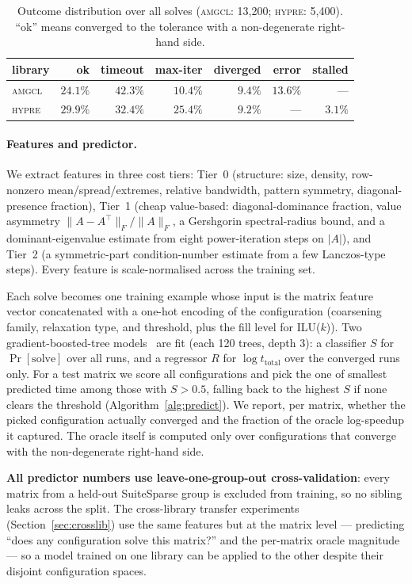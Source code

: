 \documentclass[11pt]{article}
\newcommand{\amgcl}{\textsc{amgcl}}
\newcommand{\hypre}{\textsc{hypre}}
\begin{document}
\begin{table}[t]
\centering
\caption{Outcome distribution over all solves (\amgcl{}: 13{,}200; \hypre{}:
5{,}400). ``ok'' means converged to the tolerance with a non-degenerate
right-hand side.}
\label{tab:status}
\small
\begin{tabular}{@{}lrrrrrr@{}}
\toprule
library & ok & timeout & max-iter & diverged & error & stalled \\
\midrule
\amgcl{} & $24.1\%$ & $42.3\%$ & $10.4\%$ & $9.4\%$ & $13.6\%$ & --- \\
\hypre{} & $29.9\%$ & $32.4\%$ & $25.4\%$ & $9.2\%$ & --- & $3.1\%$ \\
\bottomrule
\end{tabular}
\end{table}

\paragraph{Features and predictor.}
We extract features in three cost tiers: Tier~0 (structure: size, density,
row-nonzero mean/spread/extremes, relative bandwidth, pattern symmetry,
diagonal-presence fraction), Tier~1 (cheap value-based: diagonal-dominance
fraction, value asymmetry $\lVert A-A^{\top}\rVert_F/\lVert A\rVert_F$, a
Gershgorin spectral-radius bound, and a dominant-eigenvalue estimate from eight
power-iteration steps on $|A|$), and Tier~2 (a symmetric-part
condition-number estimate from a few Lanczos-type steps). Every feature is
scale-normalised across the training set.

Each solve becomes one training example whose input is the matrix feature
vector concatenated with a one-hot encoding of the configuration (coarsening
family, relaxation type, and threshold, plus the fill level for ILU($k$)). Two
gradient-boosted-tree models~\cite{friedman2001,scikit} are fit (each 120
trees, depth 3): a classifier $S$ for $\Pr[\text{solve}]$ over all runs, and a
regressor $R$ for $\log t_{\text{total}}$ over the converged runs only. For a
test matrix we score all configurations and pick the one of smallest predicted
time among those with $S>0.5$, falling back to the highest $S$ if none clears
the threshold (Algorithm~\ref{alg:predict}). We report, per matrix, whether the
picked configuration actually converged and the fraction of the oracle
log-speedup it captured. The oracle itself is computed only over configurations
that converge with the non-degenerate right-hand side.

\textbf{All predictor numbers use leave-one-group-out cross-validation}: every
matrix from a held-out SuiteSparse group is excluded from training, so no
sibling leaks across the split. The cross-library transfer experiments
(Section~\ref{sec:crosslib}) use the same features but at the matrix level ---
predicting ``does any configuration solve this matrix?'' and the per-matrix
oracle magnitude --- so a model trained on one library can be applied to the
other despite their disjoint configuration spaces.
\end{document}
